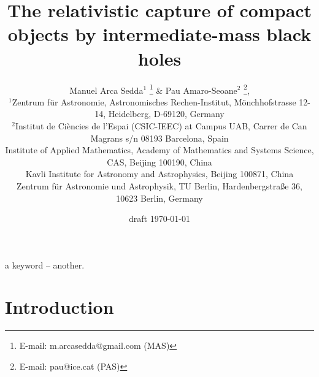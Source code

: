 \documentclass[useAMS,usenatbib]{mn2e}
\title[Formation of intermediate-mass ratio inspirals]
      {The relativistic capture of compact objects by intermediate-mass black holes}
\author[M. Arca Sedda \& P. Amaro-Seoane] %
{
Manuel Arca Sedda$^{1}$
                        \thanks{E-mail: m.arcasedda@gmail.com (MAS)} \&
Pau Amaro-Seoane$^{2}$
                        \thanks{E-mail: pau@ice.cat (PAS)},
   \\
$^{1}$Zentrum f\"{u}r Astronomie, Astronomisches Rechen-Institut, M\"onchhofstrasse 12-14, Heidelberg, D-69120, Germany\\
$^{2}$Institut de Ci{\`e}ncies de l'Espai (CSIC-IEEC) at Campus UAB,
Carrer de Can Magrans s/n 08193 Barcelona, Spain\\
Institute of Applied Mathematics, Academy of Mathematics and Systems Science,
CAS, Beijing 100190, China\\
Kavli Institute for Astronomy and Astrophysics, Beijing 100871, China\\
Zentrum f{\"u}r Astronomie und Astrophysik, TU Berlin, Hardenbergstra{\ss}e 36,
10623 Berlin, Germany
}
\begin{document}
\date{draft \today}

\pagerange{\pageref{firstpage}--\pageref{lastpage}} \pubyear{}

\maketitle

\label{firstpage}

\begin{abstract}
%
%

%
%

%
%

%
%

%
%
\end{abstract}

\begin{keywords}
a keyword -- another.
\end{keywords}


\section{Introduction}
\end{document}

